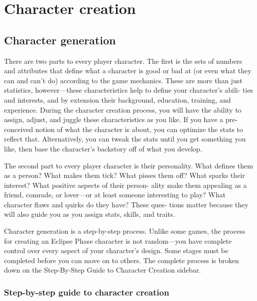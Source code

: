 \chapter{Character creation}
\label{chap:character-creation}


\section{Character generation}

  There are two parts to every player character. The
  first is the sets of numbers and attributes that define
  what a character is good or bad at (or even what they
  can and can’t do) according to the game mechanics.
  These are more than just statistics, however—these
  characteristics help to define your character’s abili-
  ties and interests, and by extension their background,
  education, training, and experience. During the
  character creation process, you will have the ability
  to assign, adjust, and juggle these characteristics as
  you like. If you have a pre-conceived notion of what
  the character is about, you can optimize the stats to
  reflect that. Alternatively, you can tweak the stats until
  you get something you like, then base the character’s
  backstory off of what you develop.

  The second part to every player character is their
  personality. What defines them as a person? What
  makes them tick? What pisses them off? What sparks
  their interest? What positive aspects of their person-
  ality make them appealing as a friend, comrade, or
  lover—or at least someone interesting to play? What
  character flaws and quirks do they have? These ques-
  tions matter because they will also guide you as you
  assign stats, skills, and traits.

  Character generation is a step-by-step process.
  Unlike some games, the process for creating an Eclipse
  Phase character is not random—you have complete
  control over every aspect of your character’s design.
  Some stages must be completed before you can move
  on to others. The complete process is broken down
  on the Step-By-Step Guide to Character Creation
  sidebar.

\subsection{Step-by-step guide to character creation}

